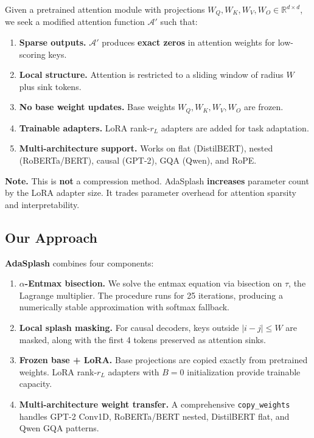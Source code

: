 Given a pretrained attention module with projections 
$W_Q, W_K, W_V, W_O \in \mathbb{R}^{d \times d}$, we seek a modified attention 
function $\mathcal{A}'$ such that:

\begin{enumerate}
\item \textbf{Sparse outputs.} $\mathcal{A}'$ produces \textbf{exact zeros} in attention
  weights for low-scoring keys.
\item \textbf{Local structure.} Attention is restricted to a sliding window of radius
  $W$ plus sink tokens.
\item \textbf{No base weight updates.} Base weights $W_Q, W_K, W_V, W_O$ are frozen.
\item \textbf{Trainable adapters.} LoRA rank-$r_L$ adapters are added for task adaptation.
\item \textbf{Multi-architecture support.} Works on flat (DistilBERT), nested
  (RoBERTa/BERT), causal (GPT-2), GQA (Qwen), and RoPE.

\end{enumerate}
\textbf{Note.} This is \textbf{not} a compression method. AdaSplash \textbf{increases} 
parameter count by the LoRA adapter size. It trades parameter overhead for 
attention sparsity and interpretability.

\subsection{Our Approach}

\textbf{AdaSplash} combines four components:

\begin{enumerate}
\item \textbf{$\alpha$-Entmax bisection.} We solve the entmax equation via bisection on
  $\tau$, the Lagrange multiplier. The procedure runs for 25 iterations,
  producing a numerically stable approximation with softmax fallback.

\item \textbf{Local splash masking.} For causal decoders, keys outside $|i - j| \leq W$
  are masked, along with the first 4 tokens preserved as attention sinks.

\item \textbf{Frozen base + LoRA.} Base projections are copied exactly from pretrained
  weights. LoRA rank-$r_L$ adapters with $B = 0$ initialization provide
  trainable capacity.

\item \textbf{Multi-architecture weight transfer.} A comprehensive \texttt{copy\_weights}
  handles GPT-2 Conv1D, RoBERTa/BERT nested, DistilBERT flat, and Qwen
  GQA patterns.

\end{enumerate}
